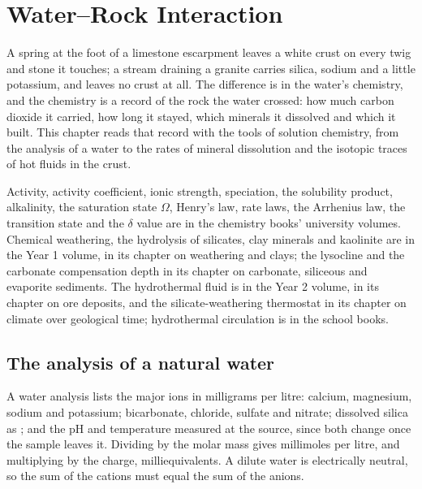\chapter{Water--Rock Interaction}\label{ch:b3:water-rock-interaction}

A spring at the foot of a limestone escarpment leaves a white crust on every
twig and stone it touches; a stream draining a granite carries silica, sodium
and a little potassium, and leaves no crust at all. The difference is in the
water's chemistry, and the chemistry is a record of the rock the water
crossed: how much carbon dioxide it carried, how long it stayed, which
minerals it dissolved and which it built. This chapter reads that record with
the tools of solution chemistry, from the analysis of a water to the rates of
mineral dissolution and the isotopic traces of hot fluids in the crust.

\begin{recall}
Activity, activity coefficient, ionic strength, speciation, the solubility
product, alkalinity, the saturation state $\Omega$, Henry's law, rate laws,
the Arrhenius law, the transition state and the $\delta$ value are in the
chemistry books' university volumes. Chemical weathering, the hydrolysis of
silicates, clay minerals and kaolinite are in the Year 1 volume, in its
chapter on weathering and clays; the lysocline and the carbonate compensation
depth in its chapter on carbonate, siliceous and evaporite sediments. The
hydrothermal fluid is in the Year 2 volume, in its chapter on ore deposits,
and the silicate-weathering thermostat in its chapter on climate over
geological time; hydrothermal circulation is in the school books.
\end{recall}

\section{The analysis of a natural water}\label{sec:b3:water-rock-interaction:analysis}

A water analysis lists the major ions in milligrams per litre: calcium,
magnesium, sodium and potassium; bicarbonate, chloride, sulfate and nitrate;
dissolved silica as ; and the pH and temperature measured at the
source, since both change once the sample leaves it. Dividing by the molar
mass gives millimoles per litre, and multiplying by the charge,
milliequivalents. A dilute water is electrically neutral, so the sum of the
cations must equal the sum of the anions.

